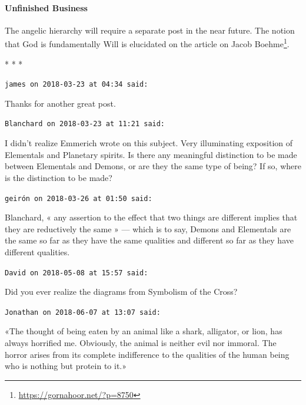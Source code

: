 \paragraph{Unfinished Business}


The angelic hierarchy will require a separate post in the near future. The notion that God is fundamentally Will is elucidated on the article on Jacob Boehme\footnote{\url{https://gornahoor.net/?p=8750}}.



\begin{center}* * *\end{center}

\begin{footnotesize}
\begin{sffamily}
\texttt{james on 2018-03-23 at 04:34 said:}

Thanks for another great post.

\hfill

\texttt{Blanchard on 2018-03-23 at 11:21 said:}

I didn't realize Emmerich wrote on this subject. Very illuminating exposition of Elementals and Planetary spirits. Is there any meaningful distinction to be made between Elementals and Demons, or are they the same type of being? If so, where is the distinction to be made?

\hfill

\texttt{geirón on 2018-03-26 at 01:50 said:}

Blanchard, « any assertion to the effect that two things are different implies that they are reductively the same » --- which is to say, Demons and Elementals are the same so far as they have the same qualities and different so far as they have different qualities.

\hfill

\texttt{David on 2018-05-08 at 15:57 said:}

Did you ever realize the diagrams from Symbolism of the Cross?

\hfill

\texttt{Jonathan on 2018-06-07 at 13:07 said:}

«The thought of being eaten by an animal like a shark, alligator, or lion, has always horrified me. Obviously, the animal is neither evil nor immoral. The horror arises from its complete indifference to the qualities of the human being who is nothing but protein to it.»


\end{sffamily}
\end{footnotesize}
